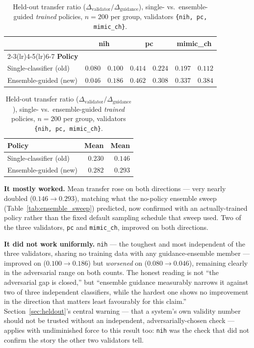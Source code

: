 \begin{table}[h]
\centering
\caption[Held-out transfer, before and after real ensemble training]{Held-out
transfer ratio ($\Delta_{\text{validator}}/\Delta_{\text{guidance}}$), single-
vs.\ ensemble-guided \emph{trained} policies, $n=200$ per group,
validators \texttt{\{nih, pc, mimic\_ch\}}.}
\label{tab:closing_transfer}
\begin{tabular}{@{}lrrrrrr@{}}
\toprule
& \multicolumn{2}{c}{\textbf{nih}} & \multicolumn{2}{c}{\textbf{pc}} & \multicolumn{2}{c}{\textbf{mimic\_ch}} \\
\cmidrule(lr){2-3}\cmidrule(lr){4-5}\cmidrule(lr){6-7}
\textbf{Policy} & \ntop{} & \pton{} & \ntop{} & \pton{} & \ntop{} & \pton{} \\
\midrule
Single-classifier (old) & $0.080$ & $0.100$ & $0.414$ & $0.224$ & $0.197$ & $0.112$ \\
Ensemble-guided (new)   & $0.046$ & $0.186$ & $0.462$ & $0.308$ & $0.337$ & $0.384$ \\
\bottomrule
\end{tabular}

\vspace{0.3em}
\begin{tabular}{@{}lrr@{}}
\toprule
\textbf{Policy} & \textbf{Mean \ntop{}} & \textbf{Mean \pton{}} \\
\midrule
Single-classifier (old) & $0.230$ & $0.146$ \\
Ensemble-guided (new)   & $\mathbf{0.282}$ & $\mathbf{0.293}$ \\
\bottomrule
\end{tabular}
\end{table}

\textbf{It mostly worked.} Mean transfer rose on both directions ---
\pton{} very nearly doubled ($0.146 \to 0.293$), matching what the
no-policy ensemble sweep (Table~\ref{tab:ensemble_sweep}) predicted, now
confirmed with an actually-trained policy rather than the fixed default
sampling schedule that sweep used. Two of the three validators, \texttt{pc}
and \texttt{mimic\_ch}, improved on both directions.

\textbf{It did not work uniformly.} \texttt{nih} --- the toughest and most
independent of the three validators, sharing no training data with any
guidance-ensemble member --- improved on \pton{} ($0.100 \to 0.186$) but
\emph{worsened} on \ntop{} ($0.080 \to 0.046$), remaining clearly in the
adversarial range on both counts. The honest reading is not ``the
adversarial gap is closed,'' but ``ensemble guidance measurably narrows it
against two of three independent classifiers, while the hardest one shows
no improvement in the direction that matters least favourably for this
claim.'' Section~\ref{sec:heldout}'s central warning --- that a system's
own validity number should not be trusted without an independent,
adversarially-chosen check --- applies with undiminished force to this
result too: \texttt{nih} was the check that did not confirm the story the
other two validators tell.

